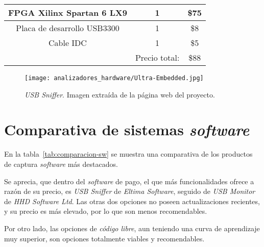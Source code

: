 \begin{itemize}
\begin{table}[hbtp]
\begin{tabular}{|c|c|c|}
            FPGA Xilinx Spartan 6 LX9 &
            1 & \$75 \\ \hline

            Placa de desarrollo USB3300 &
            1 &
            \$8 \\ \hline

            Cable IDC &
            1 &
            \$5 \\ \hline
            
            \multicolumn{1}{r}{} &
            \multicolumn{1}{c}{Precio total:} &
            \multicolumn{1}{c}{\$88} \\
        \end{tabular}
    \end{table}

    \begin{figure}[hbtp]
        \centering
        \texttt{[image: analizadores\_hardware/Ultra-Embedded.jpg]}
        \caption{\emph{USB Sniffer}. Imagen extraída de la página web del proyecto.}
        \label{fig:ultra-embedded}
    \end{figure}
\end{itemize}


\newpage
\section{Comparativa de sistemas \emph{software}}
En la tabla~\ref{tab:comparacion-sw} se muestra una comparativa de los productos de captura \emph{software} más destacados.

Se aprecia, que dentro del \emph{software} de pago, el que más funcionalidades ofrece a razón de su precio, es \emph{USB Sniffer} de \emph{Eltima Software}, seguido de \emph{USB Monitor} de \emph{HHD Software Ltd}. Las otras dos opciones no poseen actualizaciones recientes, y su precio es más elevado, por lo que son menos recomendables.

Por otro lado, las opciones de \emph{código libre}, aun teniendo una curva de aprendizaje muy superior, son opciones totalmente viables y recomendables.

